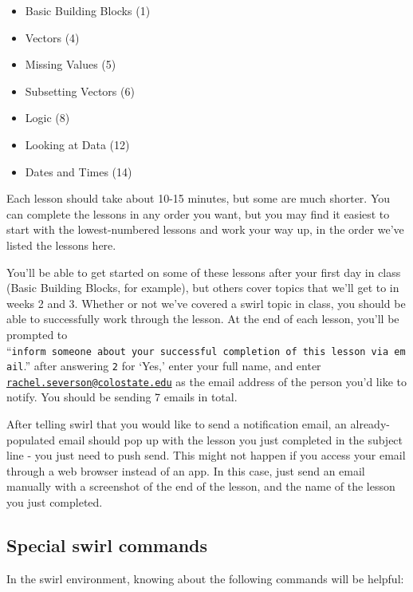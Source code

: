 \documentclass[]{book}
\makeatletter
\providecommand{\tightlist}{%
  \setlength{\itemsep}{0pt}\setlength{\parskip}{0pt}}
\newenvironment{kframe}{%
\medskip{}
\setlength{\fboxsep}{.8em}
 \def\at@end@of@kframe{}%
 \ifinner\ifhmode%
  \def\at@end@of@kframe{\end{minipage}}%
  \begin{minipage}{\columnwidth}%
 \fi\fi%
 \def\FrameCommand##1{\hskip\@totalleftmargin \hskip-\fboxsep
 \colorbox{shadecolor}{##1}\hskip-\fboxsep
     \hskip-\linewidth \hskip-\@totalleftmargin \hskip\columnwidth}%
 \MakeFramed {\advance\hsize-\width
   \@totalleftmargin\z@ \linewidth\hsize
   \@setminipage}}%
 {\par\unskip\endMakeFramed%
 \at@end@of@kframe}
\newenvironment{rmdblock}[1]
  {
  \begin{itemize}
  \renewcommand{\labelitemi}{
    \raisebox{-.7\height}[0pt][0pt]{
      {\setkeys{Gin}{width=3em,keepaspectratio}\texttt{[image: images/\#1]}}
    }
  }
  \setlength{\fboxsep}{1em}
  \begin{kframe}
  \item
  }
  {
  \end{kframe}
  \end{itemize}
  }
\newenvironment{rmdnote}
  {\begin{rmdblock}{note}}
  {\end{rmdblock}}
\theoremstyle{definition}
\theoremstyle{definition}
\theoremstyle{definition}
\theoremstyle{remark}
\makeatother
\begin{document}
\begin{itemize}
\tightlist
\item
  Basic Building Blocks (1)
\item
  Vectors (4)
\item
  Missing Values (5)
\item
  Subsetting Vectors (6)
\item
  Logic (8)
\item
  Looking at Data (12)
\item
  Dates and Times (14)
\end{itemize}

Each lesson should take about 10-15 minutes, but some are much shorter.
You can complete the lessons in any order you want, but you may find it
easiest to start with the lowest-numbered lessons and work your way up,
in the order we've listed the lessons here.

You'll be able to get started on some of these lessons after your first
day in class (Basic Building Blocks, for example), but others cover
topics that we'll get to in weeks 2 and 3. Whether or not we've covered
a swirl topic in class, you should be able to successfully work through
the lesson. At the end of each lesson, you'll be prompted to
``\texttt{inform\ someone\ about\ your\ successful\ completion\ of\ this\ lesson\ via\ email}.''
after answering \texttt{2} for `Yes,' enter your full name, and enter
\href{mailto:rachel.severson@colostate.edu}{\nolinkurl{rachel.severson@colostate.edu}}
as the email address of the person you'd like to notify. You should be
sending 7 emails in total.

\begin{rmdnote}
After telling swirl that you would like to send a notification email, an
already-populated email should pop up with the lesson you just completed
in the subject line - you just need to push send. This might not happen
if you access your email through a web browser instead of an app. In
this case, just send an email manually with a screenshot of the end of
the lesson, and the name of the lesson you just completed.
\end{rmdnote}

\subsection{Special swirl commands}\label{special-swirl-commands}

In the swirl environment, knowing about the following commands will be
helpful:
\end{document}
